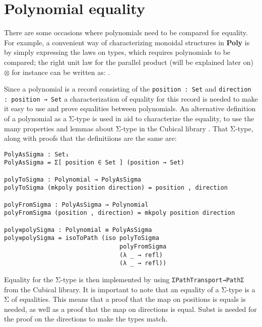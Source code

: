 \section{Polynomial equality}
There are some occasions where polynomials need to be compared for equality. For example, a convenient way of characterizing monoidal structures in \textbf{Poly} is by simply expressing the laws on types, which requires polynomials to be compared; the right unit law for the parallel product (will be explained later on) $\otimes$ for instance can be written as: .

Since a polynomial is a record consisting of the \texttt{position : Set} and \newline \texttt{direction : position → Set} a characterization of equality for this record is needed to make it easy to use and prove equalities between polynomials.
An alternative definition of a polynomial as a Σ-type is used in aid to characterize the equality, to use the many properties and lemmas about Σ-type in the Cubical library .
That Σ-type, along with proofs that the definitiions are the same are:

\begin{verbatim}
PolyAsSigma : Set₁
PolyAsSigma = Σ[ position ∈ Set ] (position → Set)

polyToSigma : Polynomial → PolyAsSigma
polyToSigma (mkpoly position direction) = position , direction
    
polyFromSigma : PolyAsSigma → Polynomial
polyFromSigma (position , direction) = mkpoly position direction

poly≡polySigma : Polynomial ≡ PolyAsSigma
poly≡polySigma = isoToPath (iso polyToSigma 
                                polyFromSigma 
                                (λ _ → refl) 
                                (λ _ → refl))
\end{verbatim}

Equality for the Σ-type is then implemented by using \texttt{ΣPathTransport→PathΣ} from the Cubical library.
It is important to note that an equality of a Σ-type is a Σ of equalities.
This means that a proof that the map on positions is equals is needed, as well as a proof that the map on directions is equal.
Subst is needed for the proof on the directions to make the types match.

